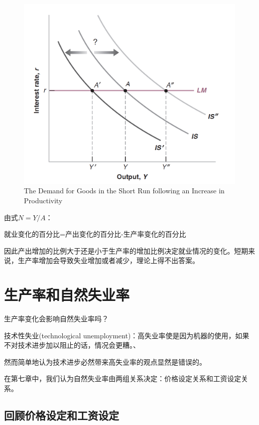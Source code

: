\documentclass{article}
\begin{document}
\begin{figure}[H] %
	\centering %
	\includegraphics[width=1\textwidth]{13_1} %
	\caption{The Demand for Goods
		in the Short Run
		following an Increase in
		Productivity} %
	\label{Fig.main2} %
\end{figure}

由式$ N=Y/A $：

就业变化的百分比=产出变化的百分比-生产率变化的百分比

因此产出增加的比例大于还是小于生产率的增加比例决定就业情况的变化。短期来说，生产率增加会导致失业增加或者减少，理论上得不出答案。

\section{生产率和自然失业率}

生产率变化会影响自然失业率吗？

技术性失业(technological unemployment)：高失业率使是因为机器的使用，如果不对技术进步加以阻止的话，情况会更糟。、

然而简单地认为技术进步必然带来高失业率的观点显然是错误的。

在第七章中，我们认为自然失业率由两组关系决定：价格设定关系和工资设定关系。

\subsection{回顾价格设定和工资设定}
\end{document}
